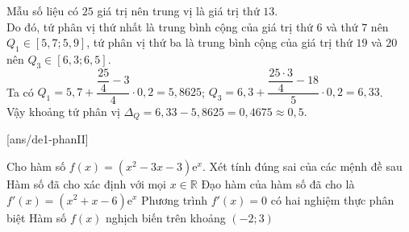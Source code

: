 \begin{ex}
{\begin{center}
\begin{tabular}{|c|c|c|c|c|c|c|}
				\hline
			\end{tabular}
		\end{center}
		Mẫu số liệu có $25$ giá trị nên trung vị là giá trị thứ $13$.\\ 
		Do đó, tứ phân vị thứ nhất là trung bình cộng của giá trị thứ $6$ và thứ $7$ nên $Q_1\in[5{,}7;5{,}9]$, tứ phân vị thứ ba là trung bình cộng của giá trị thứ $19$ và $20$ nên $Q_3\in[6{,}3;6{,}5]$.\\
		Ta có $Q_1=5{,}7+\dfrac{\dfrac{25}{4}-3}{4}\cdot0{,}2=5{,}8625$; $Q_3=6{,}3+\dfrac{\dfrac{25\cdot 3}{4}-18}{5}\cdot0{,}2=6{,}33$.\\
		Vậy khoảng tứ phân vị $\Delta_Q=6{,}33-5{,}8625=0{,}4675\approx 0{,}5$.}
\end{ex}
\TNTF
{}[ans/de1-phanII]
\begin{ex}%
	Cho hàm số $f(x)=\left(x^2-3x-3\right)\mathrm{e}^x$. Xét tính đúng sai của các mệnh đề sau
	\choiceTF
	{\True Hàm số đã cho xác định với mọi $x\in\mathbb{R}$}
	{Đạo hàm của hàm số đã cho là $f'(x)=\left(x^2+x-6\right)\mathrm{e}^x$}
	{\True Phương trình $f'(x)=0$ có hai nghiệm thực phân biệt}
	{\True Hàm số $f(x)$ nghịch biến trên khoảng $(-2;3)$}
\end{ex}
